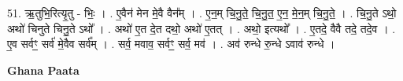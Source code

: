 \documentclass[17pt]{extarticle}
\begin{document}
51. ऋ॒तुभि॒रित्यृ॒तु - भिः॒ । . ए॒वैन॑ मेन मे॒वै वैन᳚म् । . ए॒न॒म् चि॒नु॒ते॒ चि॒नु॒त॒ ए॒न॒ मे॒न॒म् चि॒नु॒ते॒ । . चि॒नु॒ते ऽथो॒ अथो॑ चिनुते चिनु॒ते ऽथो᳚ । . अथो॑ ए॒त दे॒त दथो॒ अथो॑ ए॒तत् । . अथो॒ इत्यथो᳚ । . ए॒तदे॒ वैवै तदे॒ तदे॒व । . ए॒व सर्वꣳ॒॒ सर्व॑ मे॒वैव सर्व᳚म् । . सर्व॒ मवाव॒ सर्वꣳ॒॒ सर्व॒ मव॑ । . अव॑ रुन्धे रु॒न्धे ऽवाव॑ रुन्धे । \newline

\textbf{Ghana Paata } \newline
\end{document}
